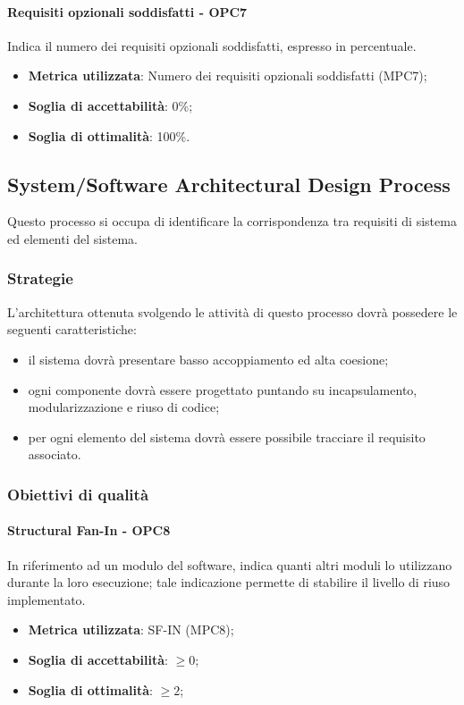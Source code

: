 \documentclass[PianoDiQualifica.tex]{subfiles}
\begin{document}
			\paragraph{Requisiti opzionali soddisfatti - OPC7}
			Indica il numero dei requisiti opzionali soddisfatti, espresso in percentuale.
			\begin{itemize}
					\item \textbf{Metrica utilizzata}: Numero dei requisiti opzionali soddisfatti (MPC7);
					\item \textbf{Soglia di accettabilità}: 0\%;
					\item \textbf{Soglia di ottimalità}: 100\%.
			\end{itemize}
		
	\subsection{System/Software Architectural Design Process}
		Questo processo si occupa di identificare la corrispondenza tra requisiti di sistema ed elementi del sistema.
		
		\subsubsection{Strategie}
		L'architettura ottenuta svolgendo le attività di questo processo dovrà possedere le seguenti caratteristiche:
		\begin{itemize}
		\item il sistema dovrà presentare basso accoppiamento ed alta coesione;
		\item ogni componente dovrà essere progettato puntando su incapsulamento, modularizzazione e riuso di codice;
		\item per ogni elemento del sistema dovrà essere possibile tracciare il requisito associato.
		\end{itemize}
		
		\subsubsection{Obiettivi di qualità}
			\paragraph{Structural Fan-In - OPC8}
			In riferimento ad un modulo del software, indica quanti altri moduli lo utilizzano durante la
			loro esecuzione; tale indicazione permette di stabilire il livello di riuso implementato. 
			\begin{itemize}
					\item \textbf{Metrica utilizzata}: SF-IN (MPC8);
					\item \textbf{Soglia di accettabilità}: \begin{math}\geq 0\end{math};
					\item \textbf{Soglia di ottimalità}: \begin{math}\geq 2\end{math};
			\end{itemize}
\end{document}
